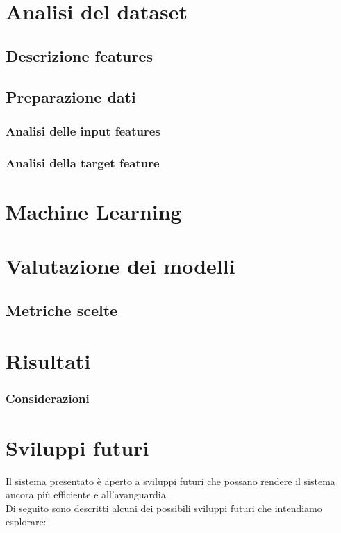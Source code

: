 \documentclass[italian,12pt,a4paper]{article}
\begin{document}
	

	\section{Analisi del dataset}
	
	\subsection{Descrizione features}

	
	\subsection{Preparazione dati}
	
	\subsubsection{Analisi delle input features}

	
	\subsubsection{Analisi della target feature}

	
	\section{Machine Learning}
	
	\section{Valutazione dei modelli}

	
	\subsection{Metriche scelte}


	\section{Risultati}


	
	\subsubsection{Considerazioni}
	
	\section{Sviluppi futuri}
	Il sistema presentato è aperto a sviluppi futuri che possano rendere il sistema ancora più efficiente e all'avanguardia. \\
	Di seguito sono descritti alcuni dei possibili sviluppi futuri che intendiamo esplorare:
	
\end{document}
